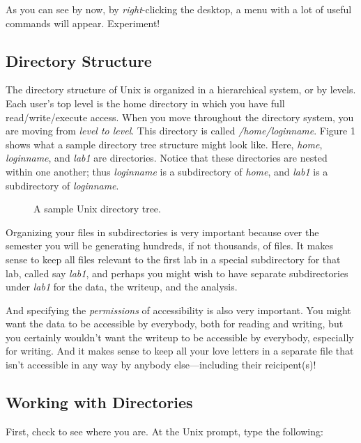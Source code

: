 	As you can see by now, by {\it right}-clicking the desktop, a
menu with a lot of useful commands will appear.  Experiment!

\subsection{Directory Structure}\label{dirstruct}

	The directory structure of Unix is organized in a hierarchical
system, or by levels.  Each user's top level is the home directory in
which you have full read/write/execute access.  When you move throughout
the directory system, you are moving from {\it level to level}.  This
directory is called {\em /home/loginname}.  Figure 1 shows what a sample
directory tree structure might look like.  Here, {\it home}, {\it
loginname}, and {\it lab1} are directories.  Notice that these
directories are nested within one another; thus {\it loginname} is a
subdirectory of {\it home}, and {\it lab1} is a subdirectory of {\it
loginname}. 

\begin{center}
\begin{figure}[h!]
\epsfysize=3in
\caption{A sample Unix directory tree.}
\end{figure}
\end{center}

	Organizing your files in subdirectories is very important
because over the semester you will be generating hundreds, if not
thousands, of files.  It makes sense to keep all files relevant to the
first lab in a special subdirectory for that lab, called say {\it lab1},
and perhaps you might wish to have separate subdirectories under {\it
lab1} for the data, the writeup, and the analysis. 

	And specifying the {\it permissions} of accessibility is also
very important.  You might want the data to be accessible by everybody,
both for reading and writing, but you certainly wouldn't want the
writeup to be accessible by everybody, especially for writing.  And it
makes sense to keep all your love letters in a separate file that isn't
accessible in any way by anybody else---including their reicipent(s)!

\subsection{Working with Directories}\label{dir}
	
	First, check to see where you are.  At the Unix prompt, type the
following:

